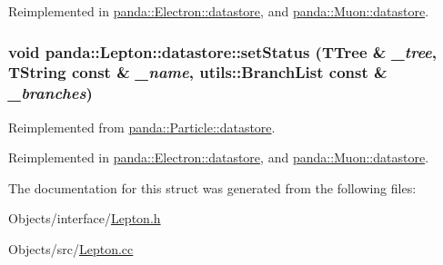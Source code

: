 Reimplemented in \hyperlink{structpanda_1_1Electron_1_1datastore_a71a4b440953afe1b0252d462753b74f1}{panda::Electron::datastore}, and \hyperlink{structpanda_1_1Muon_1_1datastore_a04e66e2ffe68566cbba217d5682c8288}{panda::Muon::datastore}.\hypertarget{structpanda_1_1Lepton_1_1datastore_a0a158cefd0f32a98625eb5736c414b01}{
\subsubsection[{setStatus}]{\setlength{\rightskip}{0pt plus 5cm}void panda::Lepton::datastore::setStatus (TTree \& {\em \_\-tree}, \/  TString const \& {\em \_\-name}, \/  {\bf utils::BranchList} const \& {\em \_\-branches})}}
\label{structpanda_1_1Lepton_1_1datastore_a0a158cefd0f32a98625eb5736c414b01}


Reimplemented from \hyperlink{structpanda_1_1Particle_1_1datastore_a82fcd5398687827418d8bdcbfc16d661}{panda::Particle::datastore}.

Reimplemented in \hyperlink{structpanda_1_1Electron_1_1datastore_af2c384514f539bcc78e55284b7eb3b67}{panda::Electron::datastore}, and \hyperlink{structpanda_1_1Muon_1_1datastore_a930f982ca62e2c7ceeb62dfcd5e03db9}{panda::Muon::datastore}.

The documentation for this struct was generated from the following files:\begin{DoxyCompactItemize}
\item 
Objects/interface/\hyperlink{Lepton_8h}{Lepton.h}\item 
Objects/src/\hyperlink{Lepton_8cc}{Lepton.cc}\end{DoxyCompactItemize}
